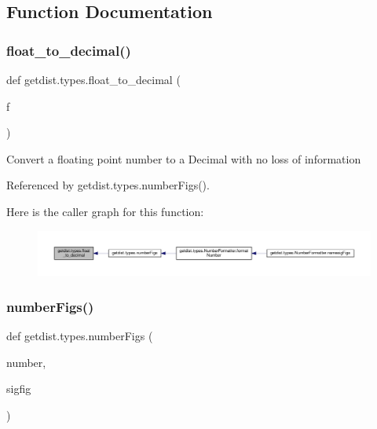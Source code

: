\subsection{Function Documentation}
\mbox{\label{namespacegetdist_1_1types_a27cfb91bfa5e76b35f81fde56b8ce2ad}} 
\subsubsection{\texorpdfstring{float\+\_\+to\+\_\+decimal()}{float\_to\_decimal()}}
{\footnotesize\ttfamily def getdist.\+types.\+float\+\_\+to\+\_\+decimal (\begin{DoxyParamCaption}\item[{}]{f }\end{DoxyParamCaption})}

\begin{DoxyVerb}Convert a floating point number to a Decimal with no loss of information\end{DoxyVerb}
 

Referenced by getdist.\+types.\+number\+Figs().

Here is the caller graph for this function\+:
\nopagebreak
\begin{figure}[H]
\begin{center}
\leavevmode
\includegraphics[width=350pt]{namespacegetdist_1_1types_a27cfb91bfa5e76b35f81fde56b8ce2ad_icgraph}
\end{center}
\end{figure}
\mbox{\label{namespacegetdist_1_1types_a4829adc4cab4c2f830294abfac22ecf7}} 
\subsubsection{\texorpdfstring{number\+Figs()}{numberFigs()}}
{\footnotesize\ttfamily def getdist.\+types.\+number\+Figs (\begin{DoxyParamCaption}\item[{}]{number,  }\item[{}]{sigfig }\end{DoxyParamCaption})}



